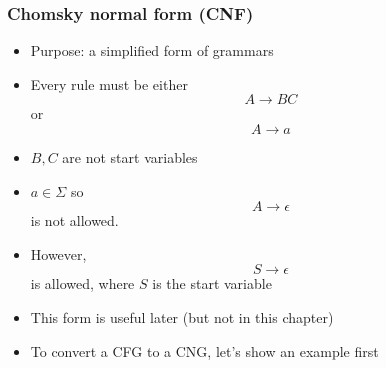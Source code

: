 




\begin{frame}[allowframebreaks] \frametitle{Chomsky normal form (CNF)}
  \begin{itemize}
\item Purpose: a simplified form of grammars
\item Every rule must be either
  \begin{equation*}
A \rightarrow BC
\end{equation*}
or
\begin{equation*}
A \rightarrow a
\end{equation*}
\item $B,C$ are not start variables
\item $a \in\Sigma $ so
  \begin{equation*}
    A \rightarrow \epsilon
  \end{equation*}
  is not allowed. 
\item However,
  \begin{equation*}
S \rightarrow \epsilon
\end{equation*}
is allowed, where $S$ is the start
variable
\item This form is useful later (but not in this chapter)
\item To convert a CFG to a CNG, let's show an example first
\end{itemize}\end{frame}

